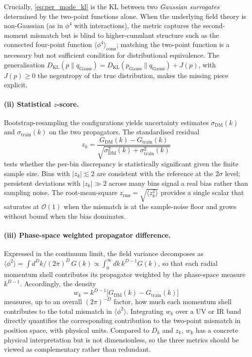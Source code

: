 \documentclass[reprint,twocolumn,superscriptaddress,preprintnumbers,amsmath,amssymb,aps,prd,floatfix]{revtex4-2}
\def\eq#1{\eqref{#1}}
\begin{document}
Crucially, \eq{eq:per_mode_kl} is the KL between two \emph{Gaussian surrogates} determined by the two-point functions alone. When the underlying field theory is non-Gaussian (as in $\phi^4$ with interactions), the metric captures the second-moment mismatch but is blind to higher-cumulant structure such as the connected four-point function $\langle\phi^4\rangle_{\text{conn}}$; matching the two-point function is a necessary but not sufficient condition for distributional equivalence. The generalisation $D_{\text{KL}}(p\|q_{\text{Gauss}})=D_{\text{KL}}(p_{\text{Gauss}}\|q_{\text{Gauss}})+J(p)$, with $J(p)\ge 0$ the negentropy of the true distribution, makes the missing piece explicit.

\paragraph{(ii) Statistical $z$-score.}
Bootstrap-resampling the configurations yields uncertainty estimates $\sigma_{\text{DM}}(k)$ and $\sigma_{\text{train}}(k)$ on the two propagators. The standardised residual
\begin{equation}
z_k = \frac{G_{\text{DM}}(k)-G_{\text{train}}(k)}{\sqrt{\sigma_{\text{DM}}^2(k)+\sigma_{\text{train}}^2(k)}}
\label{eq:prop_zscore}
\end{equation}
tests whether the per-bin discrepancy is statistically significant given the finite sample size. Bins with $|z_k|\lesssim 2$ are consistent with the reference at the $2\sigma$ level; persistent deviations with $|z_k|\gg 2$ across many bins signal a real bias rather than sampling noise. The root-mean-square $z_{\text{rms}}=\sqrt{\langle z_k^2\rangle}$ provides a single scalar that saturates at $\mathcal{O}(1)$ when the mismatch is at the sample-noise floor and grows without bound when the bias dominates.

\paragraph{(iii) Phase-space weighted propagator difference.}
Expressed in the continuum limit, the field variance decomposes as $\langle\phi^2\rangle=\int\! d^Dk/(2\pi)^D\,G(k)\propto\int_0^\infty\! dk\,k^{D-1}G(k)$, so that each radial momentum shell contributes its propagator weighted by the phase-space measure $k^{D-1}$. Accordingly, the density
\begin{equation}
w_k = k^{D-1}\bigl[G_{\text{DM}}(k)-G_{\text{train}}(k)\bigr]
\label{eq:ps_weighted_delta}
\end{equation}
measures, up to an overall $(2\pi)^{-D}$ factor, how much each momentum shell contributes to the total mismatch in $\langle\phi^2\rangle$. Integrating $w_k$ over a UV or IR band directly quantifies the corresponding contribution to the two-point mismatch in position space, with physical units. Compared to $D_k$ and $z_k$, $w_k$ has a concrete physical interpretation but is not dimensionless, so the three metrics should be viewed as complementary rather than redundant.
\end{document}

